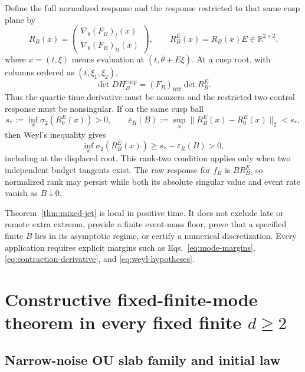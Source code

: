 \documentclass[aps,physrev,onecolumn,amsmath,amssymb,longbibliography]{revtex4-2}
\begin{document}
Define the full normalized response and the response restricted to that same
cusp plane by
\begin{equation}
 R_B(x)=
 \begin{pmatrix}
  \nabla_\theta(F_B)_t(x)\\
  \nabla_\theta(F_B)_{tt}(x)
 \end{pmatrix},
 \qquad R_B^E(x)=R_B(x)E\in\mathbb R^{2\times2}.
 \label{eq:rank-response}
\end{equation}
where \(x=(t,\xi)\) means evaluation at
\((t,\bar\theta+E\xi)\).
At a cusp root, with columns ordered as \((t,\xi_1,\xi_2)\),
\begin{equation}
 \det DH_B^{\mathrm{cusp}}
 =(F_B)_{tttt}\det R_B^E.
 \label{eq:cusp-jacobian-factorization}
\end{equation}
Thus the quartic time derivative must be nonzero and the restricted two-control
response must be nonsingular.  If on the same cusp ball
\begin{equation}
 s_*:=\inf_x\sigma_2(R_0^E(x))>0,
 \qquad
 \varepsilon_R(B):=\sup_x\|R_B^E(x)-R_0^E(x)\|_2<s_*,
 \label{eq:weyl-hypotheses}
\end{equation}
then Weyl's inequality gives
\begin{equation}
 \inf_x\sigma_2(R_B^E(x))\ge s_*-\varepsilon_R(B)>0,
 \label{eq:weyl-conclusion}
\end{equation}
including at the displaced root.  This rank-two condition applies only when
two independent budget tangents exist.  The raw response for \(f_B\) is
\(BR_B^E\), so normalized rank may persist while both its absolute singular
value and event rate vanish as \(B\downarrow0\).

Theorem~\ref{thm:mixed-jet} is local in positive time.  It does not exclude
late or remote extra extrema, provide a finite event-mass floor, prove that a
specified finite \(B\) lies in its asymptotic regime, or certify a numerical
discretization.  Every application requires explicit margins such as
Eqs.~\eqref{eq:mode-margins}, \eqref{eq:contraction-derivative}, and
\eqref{eq:weyl-hypotheses}.

\section{Constructive fixed-finite-mode theorem in every fixed finite
\texorpdfstring{$d\ge2$}{d >= 2}}
\label{sec:direct-theorem}

\subsection{Narrow-noise OU slab family and initial law}
\end{document}

